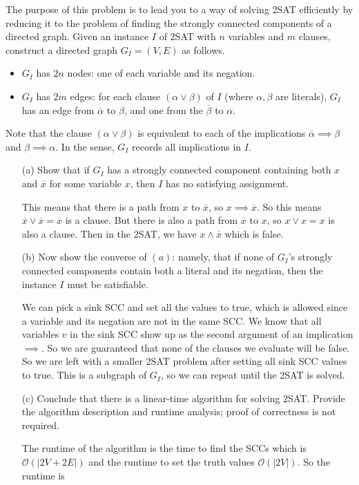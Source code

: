 \documentclass{article}
\begin{document}
The purpose of this problem is to lead you to a way of solving 2SAT efficiently by reducing it to the problem of finding the strongly connected components of a directed graph. Given an instance $I$ of 2SAT with $n$ variables and $m$ clauses, construct a directed graph $G_{I} = (V, E)$ as follows.
    \begin{itemize}
        \item $G_{I}$ has $2n$ nodes: one of each variable and its negation.

        \item $G_{I}$ has $2m$ edges: for each clause $(\alpha \lor \beta)$ of $I$ (where $\alpha, \beta$ are literals), $G_{I}$ has an edge from $\overline{\alpha}$ to $\beta$, and one from the $\overline{\beta}$ to $\alpha$.
    \end{itemize}
Note that the clause $(\alpha \lor \beta)$ is equivalent to each of the implications $\overline{\alpha} \implies \beta$ and $\beta \implies \alpha$. In the sense, $G_{I}$ records all implications in $I$.
    \begin{itemize}
        \item [(a)] Show that if $G_{I}$ has a strongly connected component containing both $x$ and $\overline{x}$ for some variable $x$, then $I$ has no satisfying assignment.
            \begin{answer}
                This means that there is a path from $x$ to $\overline{x}$, so $x \implies \overline{x}$. So this means $\overline{x} \lor \overline{x} = \overline{x}$ is a clause. But there is also a path from $\overline{x}$ to $x$, so $x \lor x = x$ is also a clause. Then in the 2SAT, we have $x \land \overline{x}$ which is false.
            \end{answer}

        \item [(b)] Now show the converse of $(a)$: namely, that if none of $G_{I}$'s strongly connected components contain both a literal and its negation, then the instance $I$ must be satisfiable.
            \begin{answer}
                We can pick a sink SCC and set all the values to true, which is allowed since a variable and its negation are not in the same SCC. We know that all variables $v$ in the sink SCC show up as the second argument of an implication $\implies$. So we are guaranteed that none of the clauses we evaluate will be false. So we are left with a smaller 2SAT problem after setting all sink SCC values to true. This is a subgraph of $G_{I}$, so we can repeat until the 2SAT is solved.
            \end{answer}

        \item [(c)] Conclude that there is a linear-time algorithm for solving 2SAT. Provide the algorithm description and runtime analysis; proof of correctness is not required.
            \begin{answer}
                The runtime of the algorithm is the time to find the SCCs which is $\mathcal{O}(\lvert 2V + 2E \rvert)$ and the runtime to set the truth values $\mathcal{O}(\lvert 2V \rvert)$. So the runtime is 
            \end{answer}
    \end{itemize}
\end{document}
